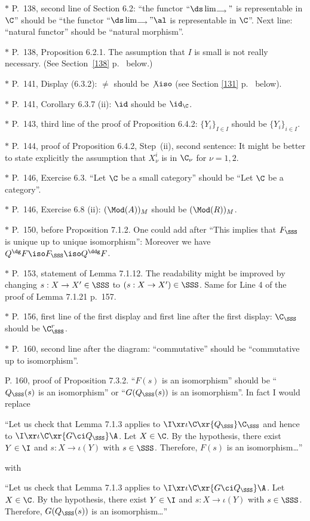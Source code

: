 \documentclass[12pt]{article}
\theoremstyle{remark}
\theoremstyle{definition}
\begin{document}
\nn$*$ P.~138, second line of Section 6.2: ``the functor $``\ds\lim_{\longrightarrow}"$ is representable in $\C$'' should be ``the functor $``\ds\lim_{\longrightarrow}"\al$ is representable in $\C$''. Next line: ``natural functor'' should be ``natural morphism''.

\nn$*$ P.~138, Proposition 6.2.1. The assumption that $I$ is small is not really necessary. (See Section~\ref{138} p.~ below.) 

\nn$*$ P.~141, Display (6.3.2): $\neq$ should be $\not\iso$ (see Section \ref{131} p.~ below). 

\nn$*$ P.~141, Corollary 6.3.7 (ii): $\id$ should be $\id_\C$. 

\nn$*$ P.~143, third line of the proof of Proposition 6.4.2: $\{Y_i\}_{I\in I}$ should be $\{Y_i\}_{i\in I}$.

\nn$*$ P.~144, proof of Proposition 6.4.2, Step~(ii), second sentence: It might be better to state explicitly the assumption that $X_\nu^i$ is in $\C_\nu$ for $\nu=1,2$. 

\nn$*$ P.~146, Exercise 6.3. ``Let $\C$ be a small category'' should be ``Let $\C$ be a category''.

\nn$*$ P.~146, Exercise 6.8 (ii): $(\Mod(A))_M$  should be $(\Mod(R))_M$.

\nn$*$ P.~150, before Proposition 7.1.2. One could add after ``This implies that $F_{\SSS}$ is unique up to unique isomorphism'': Moreover we have $Q^\dg F\iso F_{\SSS}\iso Q^\ddg F$.

\nn$*$ P.~153, statement of Lemma 7.1.12. The readability might be improved by changing $s:X\to X'\in\SSS$ to $(s:X\to X')\in\SSS$. Same for Line 4 of the proof of Lemma 7.1.21 p.~157.

\nn$*$ P.~156, first line of the first display and first line after the first display: $\C_\SSS$ should be $\C_\SSS^r$.

\nn$*$ P.~160, second line after the diagram: ``commutative'' should be ``commutative up to isomorphism''. %

%

\begin{s}
P. 160, proof of Proposition 7.3.2. ``$F(s)$ is an isomorphism'' should be ``$Q_\SSS(s)$ is an isomorphism'' or ``$G(Q_\SSS(s))$ is an isomorphism''. In fact I would replace 

\nn``Let us check that Lemma 7.1.3 applies to $\I\xr\iota\C\xr{Q_\SSS}\C_\SSS$ and hence to $\I\xr\iota\C\xr{G\ci Q_\SSS}\A$. Let $X\in\C$. By the hypothesis, there exist $Y\in\I$ and $s:X\to\iota(Y)$ with $s\in\SSS$. Therefore, $F(s)$ is an isomorphism\dots''

\nn with

\nn``Let us check that Lemma 7.1.3 applies to $\I\xr\iota\C\xr{G\ci Q_\SSS}\A$. Let $X\in\C$. By the hypothesis, there exist $Y\in\I$ and $s:X\to\iota(Y)$ with $s\in\SSS$. Therefore, $G(Q_\SSS(s))$ is an isomorphism\dots''
\end{s}
\end{document}
